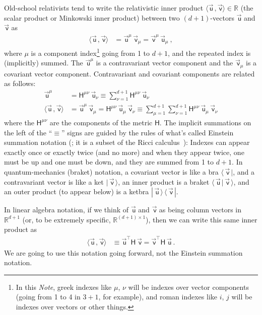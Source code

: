 \documentclass{article}
\newcommand{\metric}{\mathsf{H}}
\newcommand\upvec[1]{\!\vec{\,\mathrm{#1}}}
\newcommand{\Lvec}[1]{\upvec{\mathsf{#1}}} %
\newcommand{\inner}[2]{\langle{#1}\,,{#2}\rangle}
\newcommand{\bra}[1]{\langle\,{#1}\,|}
\newcommand{\ket}[1]{|\,{#1}\,\rangle}
\newcommand{\braket}[2]{\langle\,{#1}\,|\,{#2}\,\rangle}
\newcommand{\ketbra}[2]{|\,{#1}\,\rangle\,\langle\,{#2}\,|}
\newcommand{\plus}{\!+\!} %
\newcommand{\documentname}{\textsl{Note}}
\begin{document}
Old-school relativists tend to write the relativistic inner product $\inner{\Lvec{u}}{\Lvec{v}}\in\mathbb{R}$ (the scalar product or Minkowski inner product) between two $(d\plus1)$-vectors $\Lvec{u}$ and $\Lvec{v}$ as
\begin{align}
    \inner{\Lvec{u}}{\Lvec{v}} &= \Lvec{u}^\mu\,\Lvec{v}_\mu = \Lvec{v}^\mu\,\Lvec{u}_\mu ~,
\end{align}
where $\mu$ is a component index\footnote{In this \documentname{}, greek indexes like $\mu$, $\nu$ will be indexes over vector components (going from 1 to 4 in $3\plus1$, for example), and roman indexes like $i$, $j$ will be indexes over vectors or other things.} going from 1 to $d+1$, and the repeated index is (implicitly) summed.
The $\Lvec{u}^\mu$ is a contravariant vector component and the $\Lvec{v}_\mu$ is a covariant vector component.
Contravariant and covariant components are related as follows:
\begin{align}
    \Lvec{u}^\mu &= \metric^{\mu\nu}\,\Lvec{u}_\nu \equiv \sum_{\nu=1}^{d+1} \metric^{\mu\nu}\,\Lvec{u}_\nu
    \\
    \inner{\Lvec{u}}{\Lvec{v}} &= \Lvec{u}^\mu\,\Lvec{v}_\mu = \metric^{\mu\nu}\,\Lvec{u}_\mu\,\Lvec{v}_\nu \equiv \sum_{\mu=1}^{d+1}\sum_{\nu=1}^{d+1} \metric^{\mu\nu}\,\Lvec{u}_\mu\,\Lvec{v}_\nu
\end{align}
where the $\metric^{\mu\nu}$ are the components of the metric $\metric$.
The implicit summations on the left of the ``$\equiv$'' signs are guided by the rules of what's called Einstein summation notation (\cite{summation}; it is a subset of the Ricci calculus~\cite{ricci}): Indexes can appear exactly once or exactly twice (and no more) and when they appear twice, one must be up and one must be down, and they are summed from 1 to $d+1$.
In quantum-mechanics (braket) notation, a covariant vector is like a bra $\bra{\Lvec{v}}$, and a contravariant vector is like a ket $\ket{\Lvec{v}}$,
an inner product is a braket $\braket{\Lvec{u}}{\Lvec{v}}$, and an outer product (to appear below) is a ketbra $\ketbra{\Lvec{u}}{\Lvec{v}}$.

In linear algebra notation, if we think of $\Lvec{u}$ and $\Lvec{v}$ as being column vectors in $\mathbb{R}^{d+1}$ (or, to be extremely specific, $\mathbb{R}^{(d+1)\times 1}$), then we can write this same inner product as
\begin{align}\label{eq:inner}
    \inner{\Lvec{u}}{\Lvec{v}} &\equiv \Lvec{u}^\top\metric\,\Lvec{v} = \Lvec{v}^\top\metric\,\Lvec{u} ~.
\end{align}
We are going to use this notation going forward, not the Einstein summation notation.
\end{document}
